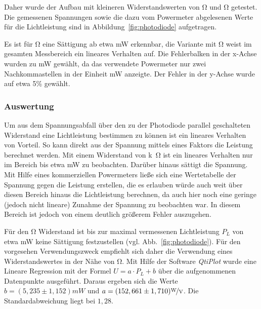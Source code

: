 Daher wurde der Aufbau mit kleineren Widerstandswerten von \unit[500]{\ohm} und \unit[1000]{\ohm} getestet. Die gemessenen Spannungen sowie die dazu vom Powermeter abgelesenen Werte für die Lichtleistung sind in Abbildung~\ref{fig:photodiode} aufgetragen.

Es ist für \unit[1]{\ohm} eine Sättigung ab etwa \unit[0,9]{mW} erkennbar, die Variante mit \unit[500]{\ohm} weist im gesamten Messbereich ein lineares Verhalten auf. Die Fehlerbalken in der x-Achse wurden zu \unit[0,01]{mW} gewählt, da das verwendete Powermeter nur zwei Nachkommastellen in der Einheit \unit{mW} anzeigte. Der Fehler in der y-Achse wurde auf etwa 5\% gewählt.


\subsubsection*{Auswertung}

Um aus dem Spannungsabfall über den zu der Photodiode parallel geschalteten Widerstand eine Lichtleistung bestimmen zu können ist ein lineares Verhalten von Vorteil. So kann direkt aus der Spannung mittels eines Faktors die Leistung berechnet werden. Mit einem Widerstand von \unit[1]{k\ohm} ist ein lineares Verhalten nur im Bereich bis etwa \unit[0,7]{mW} zu beobachten. Darüber hinaus sättigt die Spannung. Mit Hilfe eines kommerziellen Powermeters ließe sich eine Wertetabelle der Spannung gegen die Leistung erstellen, die es erlauben würde auch weit über diesen Bereich hinaus die Lichtleistung berechnen, da auch hier noch eine geringe (jedoch nicht lineare) Zunahme der Spannung zu beobachten war. In diesem Bereich ist jedoch von einem deutlich größerem Fehler auszugehen.

Für den \unit[500]{\ohm} Widerstand ist bis zur maximal vermessenen Lichtleistung $P_L$ von etwa \unit[1,1]{mW} keine Sättigung festzustellen (vgl. Abb.~\ref{fig:photodiode}). Für den vorgesehen Verwendungszweck empfiehlt sich daher die Verwendung eines Widerstandswertes in der Nähe von \unit[500]{\ohm}. Mit Hilfe der Software \textit{QtiPlot} wurde eine Lineare Regression mit der Formel $U=a\cdot P_L + b$ über die aufgenommenen Datenpunkte ausgeführt. Daraus ergeben sich die Werte $b=(5,235 \pm 1,152) \unit{mW} $ und $a=(152,661\pm 1,710) \unitfrac{W}{V}$. Die Standardabweichung liegt bei $1,28$.\\


